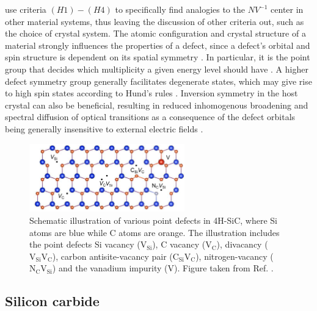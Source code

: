
\citeauthor{Weber2010} \cite{Weber2010} use criteria $(H1)-(H4)$ to specifically find analogies to the $NV^{-1}$ center in other material systems, thus leaving the discussion of other criteria out, such as the choice of crystal system. The atomic configuration and crystal structure of a material strongly influences the properties of a defect, since a defect's orbital and spin structure is dependent on its spatial symmetry \cite{Bassett2019}. In particular, it is the point group that decides which multiplicity a given energy level should have \cite{James1976}. A higher defect symmetry group generally facilitates degenerate states, which may give rise to high spin states according to Hund's rules \cite{Bassett2019, Togan2010}. Inversion symmetry in the host crystal can also be beneficial, resulting in reduced inhomogenous broadening and spectral diffusion of optical transitions as a consequence of the defect orbitals being generally insensitive to external electric fields \cite{Bassett2019}.

\begin{figure}
  \centering
  \includegraphics[width=0.6\textwidth]{theory/figures/4H-SiC.png}
  \caption{Schematic illustration of various point defects in 4H-SiC, where Si atoms are blue while C atoms are orange. The illustration includes the point defects Si vacancy ($\text{V}_{\text{Si}}$), C vacancy ($\text{V}_{\text{C}}$), divacancy ($\text{V}_{\text{Si}}\text{V}_{\text{C}}$), carbon antisite-vacancy pair ($\text{C}_{\text{Si}}\text{V}_{\text{C}}$), nitrogen-vacancy ($\text{N}_{\text{C}}\text{V}_{\text{Si}}$) and the vanadium impurity ($\text{V}$). Figure taken from Ref. \cite{Bathen2020}.}
  \label{fig:4H-SiC}
\end{figure}

\subsection{Silicon carbide}
\label{silicon-carbide}

